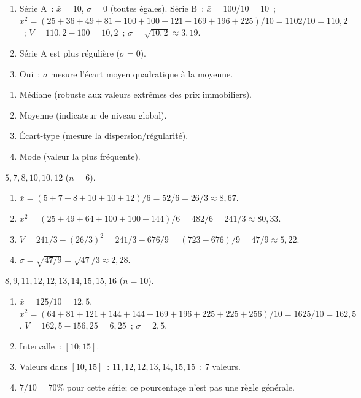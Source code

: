 
\begin{enumerate}
  \item S\'erie A~: $\bar{x}=10$, $\sigma=0$ (toutes \'egales).
        S\'erie B~: $\bar{x}=100/10=10$~; $\overline{x^2}=(25+36+49+81+100+100+121+169+196+225)/10=1102/10=110{,}2$~;
        $V=110{,}2-100=10{,}2$~; $\sigma=\sqrt{10{,}2}\approx3{,}19$.
  \item S\'erie A est plus r\'eguli\`ere ($\sigma=0$).
  \item Oui~: $\sigma$ mesure l'\'ecart moyen quadratique \`a la moyenne.
\end{enumerate}


\begin{enumerate}
  \item M\'ediane (robuste aux valeurs extr\^emes des prix immobiliers).
  \item Moyenne (indicateur de niveau global).
  \item \'Ecart-type (mesure la dispersion/r\'egularit\'e).
  \item Mode (valeur la plus fr\'equente).
\end{enumerate}


$5,7,8,10,10,12$ ($n=6$).
\begin{enumerate}
  \item $\bar{x}=(5+7+8+10+10+12)/6=52/6=26/3\approx8{,}67$.
  \item $\overline{x^2}=(25+49+64+100+100+144)/6=482/6=241/3\approx80{,}33$.
  \item $V=241/3-(26/3)^2=241/3-676/9=(723-676)/9=47/9\approx5{,}22$.
  \item $\sigma=\sqrt{47/9}=\sqrt{47}/3\approx2{,}28$.
\end{enumerate}


$8,9,11,12,12,13,14,15,15,16$ ($n=10$).
\begin{enumerate}
  \item $\bar{x}=125/10=12{,}5$.
        $\overline{x^2}=(64+81+121+144+144+169+196+225+225+256)/10=1625/10=162{,}5$.
        $V=162{,}5-156{,}25=6{,}25$~; $\sigma=2{,}5$.
  \item Intervalle~: $[10;15]$.
  \item Valeurs dans $[10,15]$~: $11,12,12,13,14,15,15$~: $7$ valeurs.
  \item $7/10=70\%$ pour cette s\'erie; ce pourcentage n'est pas une r\`egle g\'en\'erale.
\end{enumerate}

